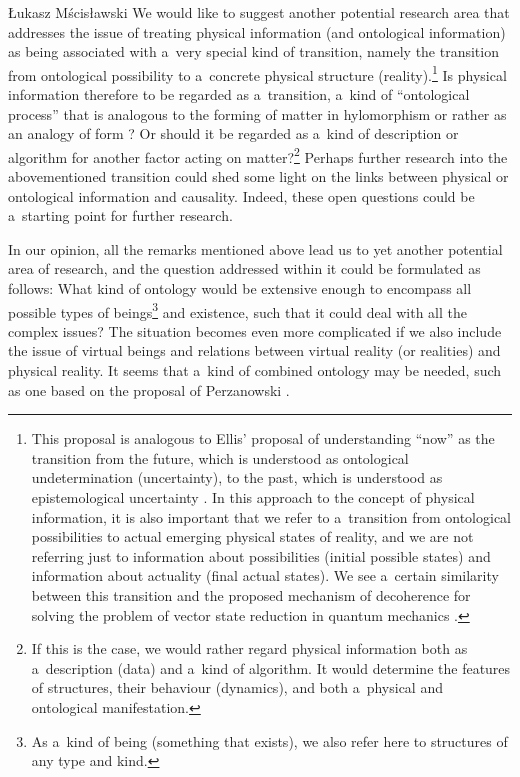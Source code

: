 \begin{artengenv}{Łukasz Mścisławski}
We would like to suggest another potential research area that addresses the issue of treating physical information (and ontological information) as being associated with a~very special kind of transition, namely the transition from ontological possibility to a~concrete physical structure (reality).\footnote{This proposal is analogous to Ellis' proposal of understanding ``now'' as the transition from the future, which is understood as ontological undetermination (uncertainty), to the past, which is understood as epistemological uncertainty
\parencite[cf.][]{ellis_space_2012}. %
 In this approach to the concept of physical information, it is also important that we refer to a~transition from ontological possibilities to actual emerging physical states of reality, and we are not referring just to information about possibilities (initial possible states) and information about actuality (final actual states). We see a~certain similarity between this transition and the proposed mechanism of decoherence for solving the problem of vector state reduction in quantum mechanics 
\parencite[cf.][]{duplantier_decoherence_2002}.%
} Is physical information therefore to be regarded as a~transition, a~kind of ``ontological process'' that is analogous to the forming of matter in hylomorphism or rather as an analogy of form 
\parencite[cf.][p.13]{krzanowski_what_2020}? %
 Or should it be regarded as a~kind of description or algorithm for another factor acting on matter?\footnote{If this is the case, we would rather regard physical information both as a~description (data) and a~kind of algorithm. It would determine the features of structures, their behaviour (dynamics), and both a~physical and ontological manifestation.} Perhaps further research into the abovementioned transition could shed some light on the links between physical or ontological information and causality. Indeed, these open questions could be a~starting point for further research.

In our opinion, all the remarks mentioned above lead us to yet another potential area of research, and the question addressed within it could be formulated as follows: What kind of ontology would be extensive enough to encompass all possible types of beings\footnote{As a~kind of being (something that exists), we also refer here to structures of any type and kind.} and existence, such that it could deal with all the complex issues? The situation becomes even more complicated if we also include the issue of virtual beings
\parencite[e.g.,][]{skowron_virtual_2020} %
 and relations between virtual reality (or realities) and physical reality. It seems that a~kind of combined ontology may be needed, such as one based on the proposal of Perzanowski 
\parencite*[][]{perzanowski_jest_2016}.%



\end{artengenv}
